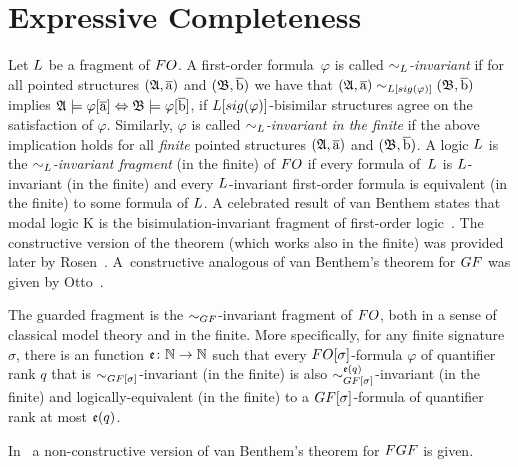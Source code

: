 
\section{Expressive Completeness}\label{sec:van-benthem-theorem}


Let $\logicL$ be a fragment of $\FO$. 
A first-order formula~$\varphi$ is called \emph{$\bisimto_{\logicL}$-invariant}
if for all pointed structures $({\mathfrak{A}},\overline{\mathrm{a}})$ and $({\mathfrak{B}}, \overline{\mathrm{b}})$ we have that  
$(\str{A},\elemtuplea) \bisimto_{\logicL[\sig(\varphi)]} (\str{B}, \elemtupleb)$ implies
${\mathfrak{A}} \models \varphi[\overline{\mathrm{a}}] \Leftrightarrow {\mathfrak{B}} \models \varphi[\overline{\mathrm{b}}]$, \ie if $\logicL[\sig(\varphi)]$-bisimilar structures agree on the satisfaction of $\varphi$.
Similarly, $\varphi$ is called \emph{$\bisimto_{\logicL}$-invariant in the finite} if the above implication holds for all \emph{finite} pointed structures $({\mathfrak{A}},\overline{\mathrm{a}})$ and $({\mathfrak{B}}, \overline{\mathrm{b}})$.
A logic $\logicL$ is the \emph{$\bisimto_{\logicL}$-invariant fragment} (in the finite) of $\FO$ if every formula of~$\logicL$ is $\logicL$-invariant (in the finite) and every $\logicL$-invariant first-order formula is equivalent (in the finite) to some formula of $\logicL$.
A celebrated result of van Benthem states that modal logic $\mathrm{K}$ is the bisimulation-invariant fragment of first-order logic~\cite[Thm.~2.2.1]{AndrekaNB98}. The constructive version of the theorem (which works also in the finite) was provided later by Rosen~\cite[Prop.~4]{Rosen97}.
A~constructive analogous of van Benthem's theorem for $\GF$ was given by Otto~\cite{Otto2012}.
\begin{theorem}\label{thm:vanBenthem-for-GF}
  The guarded fragment is the $\bisimto_{\GF}$-invariant fragment of $\FO$, both in a sense of classical model theory and in the finite.
  More specifically, for any finite signature $\sigma$, there is an  function $\mathfrak{e} \colon {\mathbb{N}} \to {\mathbb{N}}$ such that every $\FO[\sigma]$-formula $\varphi$ of quantifier rank $q$ that is $\bisimto_{\GF[\sigma]}$-invariant (in the finite) is also $\bisimto^{\homoe(q)}_{\GF[\sigma]}$-invariant (in the finite) and logically-equivalent (in the finite) to a $\GF[\sigma]$-formula of quantifier rank at most $\mathfrak{e}(q)$.
\end{theorem}
In~\cite[Thm. 5]{BednarczykJ22} a non-constructive version of van Benthem's theorem for $\FGF$ is given. 
